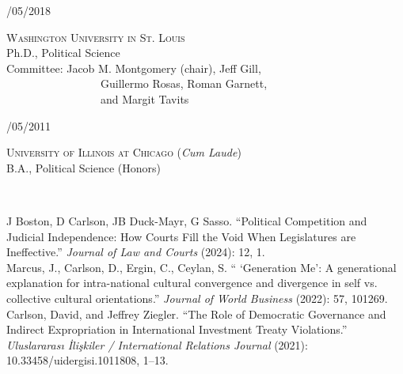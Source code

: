 \documentclass[12pt]{article}
\begin{document}
\begin{minipage}[t]{.25\textwidth}
/05/2018\\
\end{minipage}
\begin{minipage}[t]{.75\textwidth}
\FlushLeft
\textsc{Washington University in St. Louis}\\
Ph.D., Political Science\\
Committee: Jacob M. Montgomery (chair), Jeff Gill, \\~~~~~~~~~~~~~~~~~Guillermo Rosas, Roman Garnett, \\~~~~~~~~~~~~~~~~~and Margit Tavits \\
\end{minipage}
\vspace{.35cm}



\vspace{.5cm}
\begin{minipage}[t]{.25\textwidth}
/05/2011\\\end{minipage}
\begin{minipage}[t]{.75\textwidth}
\FlushLeft
\textsc{University of Illinois at Chicago} (\emph{Cum Laude})\\
B.A., Political Science (Honors)\\
\end{minipage}

\vspace{.75cm}

\\
\vspace{-.35cm}

\FlushLeft
J Boston, D Carlson, JB Duck-Mayr, G Sasso. ``Political Competition and Judicial Independence: How Courts Fill the Void When Legislatures are Ineffective.''  \emph{Journal of Law and Courts} (2024): 12, 1.\\

\FlushLeft
Marcus, J., Carlson, D., Ergin, C., Ceylan, S. `` `Generation Me': A generational explanation for intra-national cultural convergence and divergence in self vs. collective cultural orientations.''  \emph{Journal of World Business} (2022): 57, 101269.\\

\FlushLeft
Carlson, David, and Jeffrey Ziegler. ``The Role of Democratic Governance and Indirect Expropriation in International Investment Treaty Violations.'' \emph{Uluslararas{\i} \.{I}li\c{s}kiler / International Relations Journal} (2021): 10.33458/uidergisi.1011808, 1--13.\\
\end{document}
